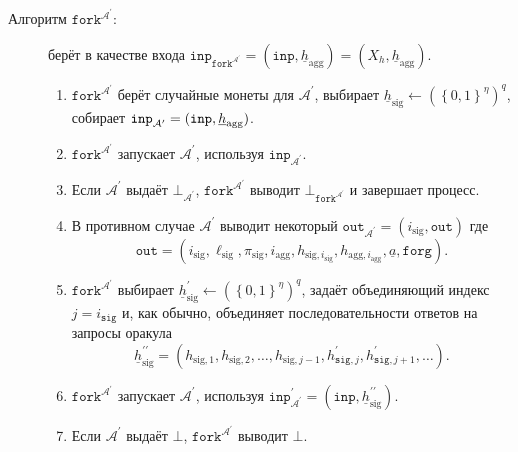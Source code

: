 \documentclass{mrl}
\theoremstyle{definition}
\numberwithin{theorem}{subsection}
\newcommand{\adversary}{\mathcal{A}}
\begin{document}
\begin{description}
\item [Алгоритм $\texttt{fork}^{\adversary^\prime}$:] берёт в качестве входа $\texttt{inp}_{\texttt{fork}^{\adversary^\prime}} = (\texttt{inp}, \underline{h}_{\text{agg}}) = (X_h, \underline{h}_{\text{agg}})$.

\begin{enumerate}
\item $\texttt{fork}^{\adversary^\prime}$ берёт случайные монеты для $\adversary^\prime$, выбирает $\underline{h}_{\text{sig}} \leftarrow (\left\{0,1\right\}^{\eta})^q$, собирает $\texttt{inp}_{\adversary^\prime} = \linebreak (\texttt{inp}, \underline{h}_{\text{agg}})$.

\item $\texttt{fork}^{\adversary^\prime}$ запускает $\adversary^\prime$, используя $\texttt{inp}_{\adversary^\prime}$.

\item Если $\adversary^\prime$ выдаёт $\bot_{\adversary^\prime}$, $\texttt{fork}^{\adversary^\prime}$ выводит $\bot_{\texttt{fork}^{\adversary^\prime}}$ и завершает процесс.

\item В противном случае $\adversary^\prime$ выводит некоторый $\texttt{out}_{\adversary^\prime} = (i_{\text{sig}}, \texttt{out})$ где \[\texttt{out} = (i_{\text{sig}}, \ell_{\text{sig}}, \pi_{\text{sig}}, i_{\text{agg}}, h_{\text{sig}, i_{\text{sig}}}, h_{\text{agg}, i_{\text{agg}}}, \underline{a}, \texttt{forg}).\]

\item $\texttt{fork}^{\adversary^\prime}$ выбирает $\underline{h}_{\text{sig}}^{\prime} \leftarrow (\left\{0,1\right\}^\eta)^q$, задаёт объединяющий индекс $j = i_{\texttt{sig}}$ и, как обычно, объединяет последовательности ответов на запросы оракула \[\underline{h}_{\text{sig}}^{\prime \prime}= (h_{\text{sig},1}, h_{\text{sig},2}, \ldots, h_{\text{sig}, j - 1}, h^{\prime}_{\texttt{sig}, j}, h^{\prime}_{\texttt{sig}, j+1}, \ldots).\]

\item $\texttt{fork}^{\adversary^\prime}$ запускает $\adversary^\prime$, используя $\texttt{inp}^{\prime}_{\adversary^\prime} = (\texttt{inp}, \underline{h}_{\text{sig}}^{\prime \prime})$.



\item Если $\adversary^\prime$ выдаёт $\bot$, $\texttt{fork}^{\adversary^\prime}$ выводит $\bot$.


\end{enumerate}
\end{description}
\end{document}
